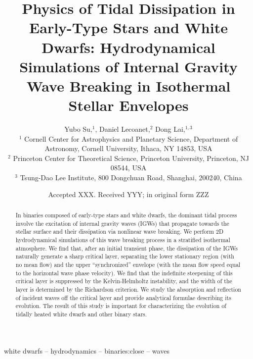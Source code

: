 \documentclass[
        fleqn,
        usenatbib,
        referee,
    ]{mnras}
\title[Physics of Tidal Dissipation]{Physics of Tidal Dissipation in Early-Type
Stars and White Dwarfs: Hydrodynamical Simulations of Internal Gravity Wave
Breaking in Isothermal Stellar Envelopes}
\author[Y. Su et\ al.]{
Yubo Su,$^1$,
Daniel Lecoanet,$^2$
Dong Lai,$^{1,3}$
\\
$^1$ Cornell Center for Astrophysics and Planetary Science, Department of
Astronomy, Cornell University, Ithaca, NY 14853, USA
\\
$^2$ Princeton Center for Theoretical Science, Princeton University, Princeton,
NJ 08544, USA
\\
$^3$ Tsung-Dao Lee Institute, 800 Dongchuan Road, Shanghai, 200240, China
}
\date{Accepted XXX\@. Received YYY\@; in original form ZZZ}
\begin{document}
\label{firstpage}
\pagerange{\pageref{firstpage}--\pageref{lastpage}}
\maketitle


\begin{abstract}
    In binaries composed of early-type stars and white dwarfs, the dominant
    tidal process involve the excitation of internal gravity waves (IGWs) that
    propagate towards the stellar surface and their dissipation via nonlinear
    wave breaking. We perform 2D hydrodynamical simulations of this wave
    breaking process in a stratified isothermal atmosphere. We find that, after
    an initial transient phase, the dissipation of the IGWs naturally generate a
    sharp critical layer, separating the lower stationary region (with no mean
    flow) and the upper ``synchronized'' envelope (with the mean flow speed
    equal to the horizontal wave phase velocity). We find that the indefinite
    steepening of this critical layer is suppressed by the Kelvin-Helmholtz
    instability, and the width of the layer is determined by the Richardson
    criterion. We study the absorption and reflection of incident waves off the
    critical layer and provide analytical formulae describing its evolution. The
    result of this study is important for characterizing the evolution of
    tidally heated white dwarfs and other binary stars.
\end{abstract}

\begin{keywords}
white dwarfs -- hydrodynamics -- binaries:close -- waves %
\end{keywords}

\end{document}
